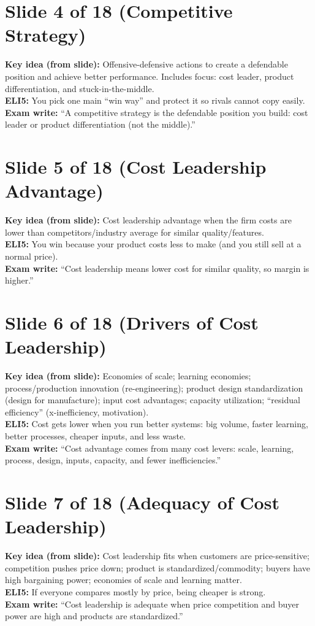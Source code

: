 \documentclass[11pt,a4paper]{article}
\begin{document}
\section*{Slide 4 of 18 (Competitive Strategy)}
\textbf{Key idea (from slide):} Offensive-defensive actions to create a defendable position and achieve better performance. Includes focus: cost leader, product differentiation, and stuck-in-the-middle.\\
\textbf{ELI5:} You pick one main ``win way'' and protect it so rivals cannot copy easily.\\
\textbf{Exam write:} ``A competitive strategy is the defendable position you build: cost leader or product differentiation (not the middle).''

\section*{Slide 5 of 18 (Cost Leadership Advantage)}
\textbf{Key idea (from slide):} Cost leadership advantage when the firm costs are lower than competitors/industry average for similar quality/features.\\
\textbf{ELI5:} You win because your product costs less to make (and you still sell at a normal price).\\
\textbf{Exam write:} ``Cost leadership means lower cost for similar quality, so margin is higher.''

\section*{Slide 6 of 18 (Drivers of Cost Leadership)}
\textbf{Key idea (from slide):} Economies of scale; learning economies; process/production innovation (re-engineering); product design standardization (design for manufacture); input cost advantages; capacity utilization; ``residual efficiency'' (x-inefficiency, motivation).\\
\textbf{ELI5:} Cost gets lower when you run better systems: big volume, faster learning, better processes, cheaper inputs, and less waste.\\
\textbf{Exam write:} ``Cost advantage comes from many cost levers: scale, learning, process, design, inputs, capacity, and fewer inefficiencies.''

\section*{Slide 7 of 18 (Adequacy of Cost Leadership)}
\textbf{Key idea (from slide):} Cost leadership fits when customers are price-sensitive; competition pushes price down; product is standardized/commodity; buyers have high bargaining power; economies of scale and learning matter.\\
\textbf{ELI5:} If everyone compares mostly by price, being cheaper is strong.\\
\textbf{Exam write:} ``Cost leadership is adequate when price competition and buyer power are high and products are standardized.''
\end{document}
